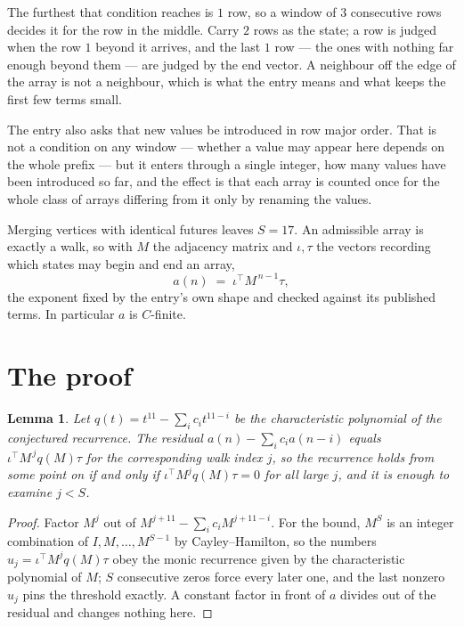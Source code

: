 \documentclass[11pt,a4paper]{article}
\theoremstyle{plain}
\newtheorem{lemma}[theorem]{Lemma}
\theoremstyle{definition}
\begin{document}
The furthest that condition reaches is $1$ row, so a window of $3$ consecutive rows decides it for the row in the middle. Carry $2$ rows as the state; a row is judged when the row $1$ beyond it arrives, and the last $1$ row --- the ones with nothing far enough beyond them --- are judged by the end vector. A neighbour off the edge of the array is not a neighbour, which is what the entry means and what keeps the first few terms small.

The entry also asks that new values be introduced in row major order. That is not a condition on any window --- whether a value may appear here depends on the whole prefix --- but it enters through a single integer, how many values have been introduced so far, and the effect is that each array is counted once for the whole class of arrays differing from it only by renaming the values.

Merging vertices with identical futures leaves $S=17$. An admissible array is exactly a walk, so with $M$ the adjacency matrix and $\iota,\tau$ the vectors recording which states may begin and end an array,
\[
a(n)\;=\;\iota^{\!\top}M^{\,n-1}\tau ,
\]
the exponent fixed by the entry's own shape and checked against its published terms. In
particular $a$ is $C$-finite.

\section{The proof}

\begin{lemma}\label{lem:crit}
Let $q(t)=t^{11}-\sum_i c_it^{11-i}$ be the characteristic polynomial of the
conjectured recurrence. The residual $a(n)-\sum_ic_ia(n-i)$ equals
$\iota^{\!\top}M^{\,j}q(M)\tau$ for the corresponding walk index $j$, so the recurrence
holds from some point on if and only if $\iota^{\!\top}M^{j}q(M)\tau=0$ for all large $j$,
and it is enough to examine $j<S$.
\end{lemma}

\begin{proof}
Factor $M^{j}$ out of $M^{j+11}-\sum_ic_iM^{j+11-i}$. For the bound, $M^{S}$
is an integer combination of $I,M,\dots,M^{S-1}$ by Cayley--Hamilton, so the numbers
$u_j=\iota^{\!\top}M^{j}q(M)\tau$ obey the monic recurrence given by the characteristic
polynomial of $M$; $S$ consecutive zeros force every later one, and the last nonzero $u_j$
pins the threshold exactly. A constant factor in front of $a$ divides out of the residual and
changes nothing here.
\end{proof}
\end{document}
